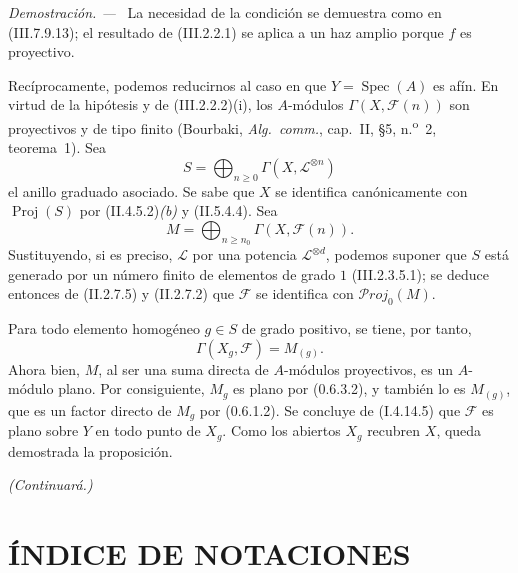 \documentclass[10pt,oneside]{book}
\newcommand{\Spec}{\operatorname{Spec}}
\newcommand{\Proj}{\operatorname{Proj}}
\newcommand{\sref}[2][]{\textup{(#2)}}
\newcommand{\oldpage}[2][]{\setcounter{footnote}{0}\marginpar{\scriptsize\textbf{#1}~|~#2}\ignorespaces}
\newenvironment{proof}{\par\medskip\noindent\textit{Demostración. ---\ }}{\par}
\begin{document}
\begin{proof}
La necesidad de la condición se demuestra como en
\sref{III.7.9.13}; el resultado de \sref{III.2.2.1} se aplica a un
haz amplio porque $f$ es proyectivo.

Recíprocamente, podemos reducirnos al caso en que
$Y=\Spec(A)$ es afín. En virtud de la hipótesis y de
\sref{III.2.2.2}{(i)}, los $A$-módulos
$\Gamma(X,\mathscr F(n))$ son proyectivos y de tipo finito
(Bourbaki, \emph{Alg.~comm.}, cap.~II, \S5,
n.\textsuperscript{o}~2, teorema~1). Sea
\[
  S=\bigoplus_{n\geq0}\Gamma(X,\mathscr L^{\otimes n})
\]
el anillo graduado asociado. Se sabe que $X$ se identifica
canónicamente con $\Proj(S)$ por
\sref[II]{II.4.5.2}{\emph{(b)}} y \sref[II]{II.5.4.4}. Sea
\[
  M=\bigoplus_{n\geq n_0}\Gamma(X,\mathscr F(n)).
\]
Sustituyendo, si es preciso, $\mathscr L$ por una potencia
$\mathscr L^{\otimes d}$, podemos suponer que $S$ está generado por
un número finito de elementos de grado $1$
\sref{III.2.3.5.1}; se deduce entonces de
\sref[II]{II.2.7.5} y \sref[II]{II.2.7.2} que $\mathscr F$ se
identifica con $\mathscr P\!roj_0(M)$.

Para todo elemento homogéneo $g\in S$ de grado positivo, se tiene,
por tanto,
\[
  \Gamma(X_g,\mathscr F)=M_{(g)}.
\]
Ahora bien, $M$, al ser una suma directa de $A$-módulos
proyectivos, es un $A$-módulo plano. Por consiguiente, $M_g$ es
plano por \sref[0]{0.6.3.2}, y también lo es $M_{(g)}$, que es un
factor directo de $M_g$ por \sref[0]{0.6.1.2}. Se concluye de
\sref[I]{I.4.14.5} que $\mathscr F$ es plano sobre $Y$ en todo
punto de $X_g$. Como los abiertos $X_g$ recubren $X$, queda
demostrada la proposición.
\end{proof}

\bigskip
\noindent\emph{(Continuará.)}

\clearpage
\oldpage[III]{213}

\section*{ÍNDICE DE NOTACIONES}
\end{document}
